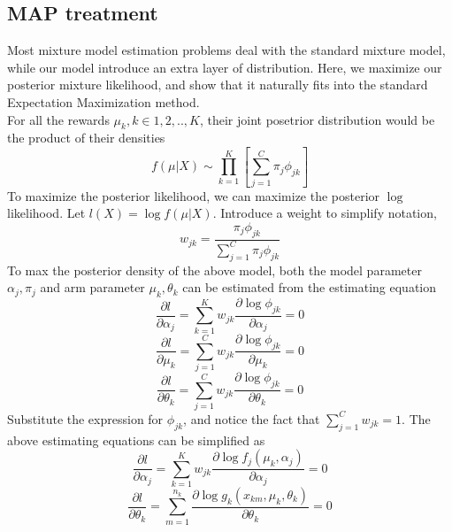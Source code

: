 \documentclass{article}
\begin{document}
\subsection{MAP treatment}
Most mixture model estimation problems deal with the standard mixture model, while our model introduce an extra layer of distribution. Here, we maximize our posterior mixture likelihood, and show that it naturally fits into the standard Expectation Maximization method.  \\
For all the rewards $\mu_k,k\in 1,2,..,K$, their joint posetrior distribution would be the product of their densities
\begin{equation}
f(\mu|X) \sim \prod\limits_{k=1}^K [\sum\limits_{j=1}^C \pi_j \phi_{jk}]
\end{equation}
To maximize the posterior likelihood, we can maximize the posterior $\log$ likelihood. Let $l(X) = \log f(\mu|X) $. Introduce a weight to simplify notation,
\begin{equation}
w_{jk} = \frac{\pi_j \phi_{jk}}{ \sum\limits_{j=1}^C \pi_j \phi_{jk} }
\end{equation}
To max the posterior density of the above model, both the model parameter $\alpha_j,\pi_j$ and arm parameter $\mu_k,\theta_k$ can be estimated from the estimating equation
\begin{equation}
\frac{\partial l}{\partial \alpha_j} = \sum\limits_{k=1}^K w_{jk} \frac{\partial \log \phi_{jk}}{\partial \alpha_j} = 0
\end{equation}
\begin{equation}
\frac{\partial l}{\partial \mu_k} = \sum\limits_{j=1}^{C} w_{jk} \frac{\partial \log \phi_{jk}}{\partial \mu_k} = 0
\end{equation}
\begin{equation}
\frac{\partial l}{\partial \theta_k} = \sum\limits_{j=1}^C w_{jk} \frac{\partial \log \phi_{jk}}{\partial \theta_k} =0
\end{equation}
Substitute the expression for $\phi_{jk}$, and notice the fact that $\sum\limits_{j=1}^C w_{jk} =1$. The above estimating equations can be simplified as
\begin{equation}
\frac{\partial l}{\partial\alpha_j} = \sum\limits_{k=1}^K w_{jk} \frac{\partial \log f_j(\mu_k,\alpha_j)}{\partial \alpha_j} = 0
\end{equation}
\begin{equation}
\frac{\partial l}{\partial \theta_k} = \sum\limits_{m=1}^{n_k} \frac{\partial \log g_k(x_{km},\mu_k,\theta_k)}{\partial \theta_k} = 0
\end{equation}
\end{document}
